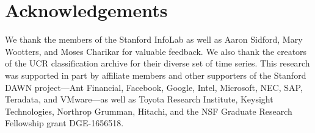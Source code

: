 \documentclass[sigconf,10pt]{acmart}
\theoremstyle{problem}
\begin{document}
%



%



%

\section*{Acknowledgements}
We thank the members of the Stanford InfoLab as well as Aaron Sidford, Mary Wootters, and Moses Charikar for valuable feedback.  
We also thank the creators of the UCR classification archive for their diverse set of time series.
This research was supported in part by affiliate members and other supporters of the Stanford DAWN project---Ant Financial, Facebook, Google, Intel, Microsoft, NEC, SAP, Teradata, and VMware---as well as Toyota Research Institute, Keysight Technologies, Northrop Grumman, Hitachi, and the NSF Graduate Research Fellowship grant DGE-1656518.



{\footnotesize
}
%
\end{document}
